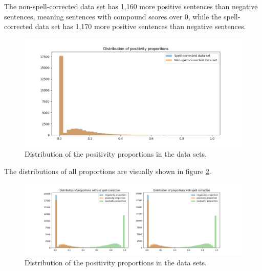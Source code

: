 The non-spell-corrected data set has 1,160 more positive sentences than negative sentences, meaning sentences with compound scores over 0, while the spell-corrected data set has 1,170 more positive sentences than negative sentences.


\begin{figure}[H]
    \centering
    \includegraphics[width=1\textwidth]{resources/positivity_distributions.png}
    \caption{Distribution of the positivity proportions in the data sets.}
    \label{fig:positivity_distribution}
\end{figure}

The distributions of all proportions are visually shown in figure \ref{fig:proportions}.

\begin{figure}[H]
    \centering
    \includegraphics[width=1\textwidth]{resources/proportions.png}
    \caption{Distribution of the positivity proportions in the data sets.}
    \label{fig:proportions}
\end{figure}